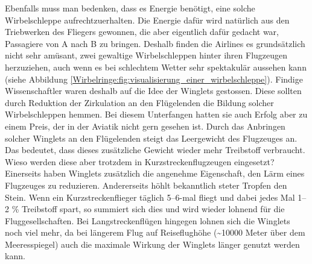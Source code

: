 Ebenfalls muss man bedenken, dass es Energie benötigt, eine solche Wirbelschleppe aufrechtzuerhalten.
Die Energie dafür wird natürlich aus den Triebwerken des Fliegers gewonnen, die aber eigentlich dafür gedacht war, Passagiere von A nach B zu bringen.
Deshalb finden die Airlines es grundsätzlich nicht sehr amüsant, zwei gewaltige Wirbelschleppen hinter ihren Flugzeugen herzuziehen, auch wenn es bei schlechtem Wetter sehr spektakulär aussehen kann (siehe Abbildung \ref{Wirbelringe:fig:visualisierung_einer_wirbelschleppe}). 
Findige Wissenschaftler waren deshalb auf die Idee der Winglets gestossen.
Diese sollten durch Reduktion der Zirkulation an den Flügelenden die Bildung solcher Wirbelschleppen hemmen.
Bei diesem Unterfangen hatten sie auch Erfolg aber zu einem Preis, der in der Aviatik nicht gern gesehen ist.
Durch das Anbringen solcher Winglets an den Flügelenden steigt das Leergewicht des Flugzeuges an.
Das bedeutet, dass dieses zusätzliche Gewicht wieder mehr Treibstoff verbraucht.
Wieso werden diese aber trotzdem in Kurzstreckenflugzeugen eingesetzt?
Einerseits haben Winglets zusätzlich die angenehme Eigenschaft, den Lärm eines Flugzeuges zu reduzieren.
Andererseits höhlt bekanntlich steter Tropfen den Stein.
Wenn ein Kurzstreckenflieger täglich 5--6-mal fliegt und dabei jedes Mal 1--2 \% Treibstoff spart, so summiert sich dies und wird wieder lohnend für die Fluggesellschaften.
Bei Langstreckenflügen hingegen lohnen sich die Winglets noch viel mehr, da bei längerem Flug auf Reiseflughöhe (\textasciitilde10000 Meter über dem Meeresspiegel) auch die maximale Wirkung der Winglets länger genutzt werden kann.
